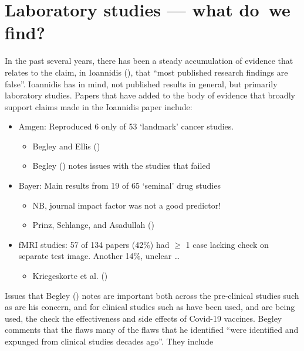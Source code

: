 \documentclass[
  10ptls,
  b5paper]{book}
\providecommand{\tightlist}{%
  \setlength{\itemsep}{0pt}\setlength{\parskip}{0pt}}
\begin{document}
\section{Laboratory studies --- what do~we find?}\label{sec:lab}

In the past several years, there has been a steady accumulation
of evidence that relates to the claim, in Ioannidis (),
that ``most published research findings are false''. Ioannidis
has in mind, not published results in general, but primarily
laboratory studies. Papers that have added to the
body of evidence that broadly support claims made in the
Ioannidis paper include:

\begin{itemize}
\tightlist
\item
  Amgen: Reproduced 6 only of 53 `landmark' cancer studies.

  \begin{itemize}
  \tightlist
  \item
    Begley and Ellis ()
  \item
    Begley () notes issues with the studies that failed
  \end{itemize}
\item
  Bayer: Main results from 19 of 65 `seminal' drug studies

  \begin{itemize}
  \tightlist
  \item
    NB, journal impact factor was not a good predictor!
  \item
    Prinz, Schlange, and Asadullah ()
  \end{itemize}
\item
  fMRI studies: 57 of 134 papers (42\%) had \(\geq\) 1 case lacking
  check on separate test image.
  Another 14\%, unclear \ldots{}

  \begin{itemize}
  \tightlist
  \item
    Kriegeskorte et al. ()
  \end{itemize}
\end{itemize}

Issues that Begley () notes are important both across
the pre-clinical studies such as are his concern, and for
clinical studies such as have been used, and are being used,
the check the effectiveness and side effects of Covid-19
vaccines. Begley comments that the flaws many of the
flaws that he identified ``were identified and expunged from
clinical studies decades ago''. They include
\end{document}
